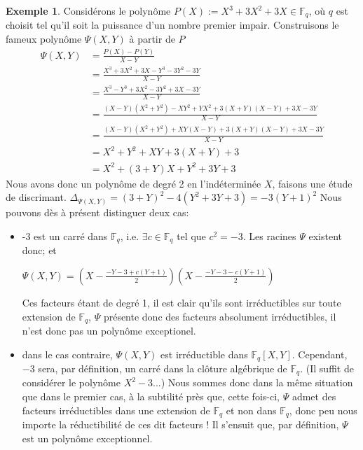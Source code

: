 \documentclass[12pt]{article}
\newcommand{\Fq}{\mathds{F}_q}
\theoremstyle{definition}
\newtheorem{example}{Exemple}
\begin{document}
\begin{example}
Considérons le polynôme $P(X) := X^3 +3X^2 + 3X \in \Fq$, où $q$ est choisit tel qu'il soit la puissance d'un nombre premier impair. \newline
Construisons le fameux polynôme $\Psi(X,Y)$ à partir de $P$
	\begin{align*}
\Psi(X,Y) &= \displaystyle\frac{P(X) - P(Y)}{X-Y} \\
&= \displaystyle\frac{X^3 + 3X^2 + 3X - Y^3 - 3Y^2 - 3Y}{X -Y} \\
&= \displaystyle\frac{X^3 - Y^3 + 3X^2 - 3Y^2 + 3X - 3Y}{X -Y} \\
&= \displaystyle\frac{(X-Y)(X^2+Y^2) - XY^2 + YX^2 + 3(X+Y)(X-Y) +3X - 3Y}{X -Y} \\
&= \displaystyle\frac{(X-Y)(X^2+Y^2) + XY(X-Y) + 3(X+Y)(X-Y) +3X - 3Y}{X -Y} \\
&= \displaystyle X^2+Y^2 +XY+ 3(X+Y) +3\\
&= X^2 + (3+Y)X + Y^2 + 3Y + 3
	\end{align*}
Nous avons donc un polynôme de degré 2 en l'indéterminée $X$, faisons une étude de discrimant. \newline
$\Delta_{\Psi(X,Y)} = (3+Y)^2 - 4(Y^2 + 3Y + 3) = -3(Y+1)^2$ \newline 
Nous pouvons dès à présent distinguer deux cas: 
	\begin{itemize}
		\item -3 est un carré dans $\Fq$, i.e. $\exists c\in \Fq$ tel que $c^2 = -3$. Les racines $\Psi$ existent donc; et 
			\begin{center} $\Psi(X,Y) = (\displaystyle X - \frac{-Y -3 + c(Y+1)}{2})( X - \frac{-Y -3 - c(Y+1)}{2})$\end{center}
Ces facteurs étant de degré 1, il est clair qu'ils sont irréductibles sur toute extension de $\Fq$, $\Psi$ présente donc des facteurs absolument irréductibles, il n'est donc pas un polynôme exceptionel.
		\item dans le cas contraire, $\Psi(X,Y)$ est irréductible dans $\Fq[X,Y]$. Cependant, $-3$ sera, par définition, un carré dans la clôture algébrique de $\Fq$. (Il suffit de considérer le polynôme $X^2 - 3$...) Nous sommes donc dans la même situation que dans le premier cas, à la subtilité près que, cette fois-ci, $\Psi$ admet des facteurs irréductibles dans une extension de $\Fq$ et non dans $\Fq$, donc peu nous importe la réductibilité de ces dit facteurs ! Il s'ensuit que, par définition, $\Psi$ est un polynôme exceptionnel.
		\end{itemize}
\end{example}
\end{document}
